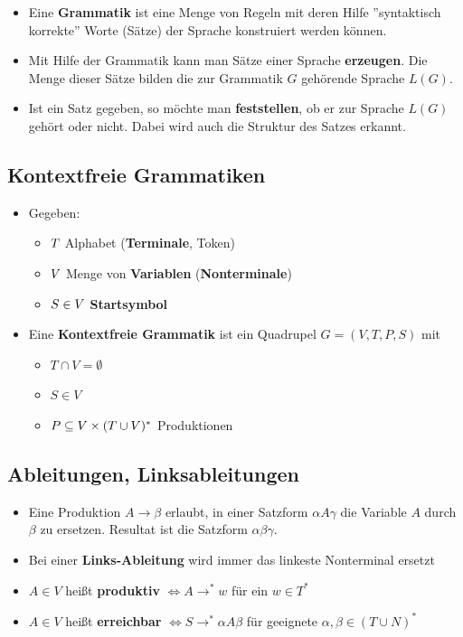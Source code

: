 \documentclass{scrartcl}
\begin{document}
\begin{itemize}
	\item Eine \textbf{Grammatik} ist eine Menge von Regeln mit deren Hilfe ''syntaktisch korrekte'' Worte (Sätze) der Sprache konstruiert werden können.
	\item Mit Hilfe der Grammatik kann man Sätze einer Sprache \textbf{erzeugen}. Die Menge dieser Sätze bilden die zur Grammatik $G$ gehörende Sprache $L(G)$.
	\item Ist ein Satz gegeben, so möchte man \textbf{feststellen}, ob er zur Sprache $L(G)$ gehört oder nicht. Dabei wird auch die Struktur des Satzes erkannt.
\end{itemize}

\subsection{Kontextfreie Grammatiken}

\begin{itemize}
	\item Gegeben:
	\begin{itemize}
		\item $T \hfill$ Alphabet (\textbf{Terminale}, Token)
		\item $V \hfill$ Menge von \textbf{Variablen} (\textbf{Nonterminale})
		\item $S \in V \hfill$ \textbf{Startsymbol}
	\end{itemize}
	\item Eine \textbf{Kontextfreie Grammatik} ist ein Quadrupel $G = (V, T, P, S)$ mit
	\begin{itemize}
		\item $T \cap V = \emptyset$
		\item $S \in V$
		\item $P \subseteq V \times (T \cup V)^* \hfill$ Produktionen
	\end{itemize}
\end{itemize}

\subsection{Ableitungen, Linksableitungen}

\begin{itemize}
	\item Eine Produktion $A \rightarrow \beta$ erlaubt, in einer Satzform $\alpha A \gamma$ die Variable $A$ durch $\beta$ zu ersetzen. Resultat ist die Satzform $\alpha \beta \gamma$.
	\item Bei einer \textbf{Links-Ableitung} wird immer das linkeste Nonterminal ersetzt
	\item $A \in V$ heißt \textbf{produktiv} $\iff A \rightarrow^* w$ für ein $w \in T^*$
	\item $A \in V$ heißt \textbf{erreichbar} $\iff S \rightarrow^* \alpha A \beta$ für geeignete $\alpha,\beta \in (T \cup N)^*$
\end{itemize}
\end{document}
